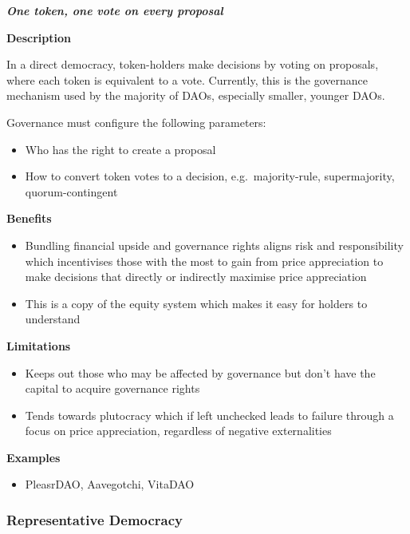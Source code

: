 \documentclass[
]{article}
\providecommand{\tightlist}{%
  \setlength{\itemsep}{0pt}\setlength{\parskip}{0pt}}
\begin{document}
\textbf{\emph{One token, one vote on every proposal}}

\textbf{Description}

In a direct democracy, token-holders make decisions by voting on
proposals, where each token is equivalent to a vote. Currently, this is
the governance mechanism used by the majority of DAOs, especially
smaller, younger DAOs.

Governance must configure the following parameters:

\begin{itemize}
\tightlist
\item
  Who has the right to create a proposal
\item
  How to convert token votes to a decision, e.g.~majority-rule,
  supermajority, quorum-contingent
\end{itemize}

\textbf{Benefits}

\begin{itemize}
\tightlist
\item
  Bundling financial upside and governance rights aligns risk and
  responsibility which incentivises those with the most to gain from
  price appreciation to make decisions that directly or indirectly
  maximise price appreciation
\item
  This is a copy of the equity system which makes it easy for holders to
  understand
\end{itemize}

\textbf{Limitations}

\begin{itemize}
\tightlist
\item
  Keeps out those who may be affected by governance but don't have the
  capital to acquire governance rights
\item
  Tends towards plutocracy which if left unchecked leads to failure
  through a focus on price appreciation, regardless of negative
  externalities
\end{itemize}

\textbf{Examples}

\begin{itemize}
\tightlist
\item
  PleasrDAO, Aavegotchi, VitaDAO
\end{itemize}

\hypertarget{representative-democracy}{%
\subsubsection{\texorpdfstring{\textbf{Representative
Democracy}}{Representative Democracy}}\label{representative-democracy}}
\end{document}
